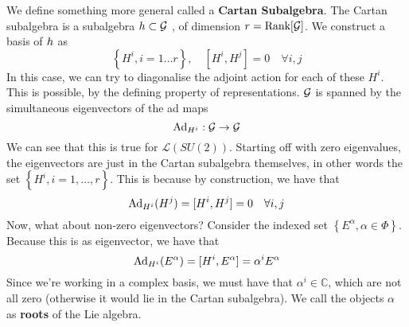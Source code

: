 We define something more general called a \textbf{Cartan Subalgebra}. 
The Cartan subalgebra is a subalgebra $ h \subset \mathcal{ G } $ ,
of dimension $ r = \text{Rank} [ \mathcal{ G } ] $. 
We construct a basis of $ h $ as 
\[
	\left\{  H ^ i , i =1 \dots r  \right\} , \quad [ H ^ i , H ^ j ]  =0 \quad \forall 
	i , j 
\] In this case, we can try to diagonalise the adjoint
action for each of these $ H ^ i $. This is possible, by the defining 
property of representations.
 $ \mathcal{ G } $ is spanned by the simultaneous eigenvectors of the ad maps 
 \[
  \text{Ad}_{ H ^ i } : \mathcal{ G } \to \mathcal{ G } 
 \] We can see that this is 
 true for $ \mathcal{ L } ( SU ( 2) ) $.
 Starting off with zero eigenvalues, the eigenvectors are just in the Cartan 
 subalgebra themselves, in other words the set $\left\{ H ^ i , i = 1 , \dots ,r   \right\} $. 
 This is because by construction, we have that 
 \[
	 \text{Ad} _{ H ^ i } ( H ^ j ) = [ H ^ i , H ^ j ] = 0 \quad \forall i , j 
 \] Now, what about non-zero eigenvectors? 
 Consider the indexed set $ \left\{  E ^ \alpha , \alpha \in \Phi  \right\} $. 
 Because this is as eigenvector, we have that 
 \[
	 \text{Ad}_{ H ^  i } ( E ^{ \alpha } ) = [ H ^ i , E ^{ \alpha } ] = \alpha ^ i E ^ \alpha  
 \] Since we're working in a complex basis, we must have that 
 $ \alpha ^ i \in \mathbb{ C} $, which are not all zero (otherwise it 
 would lie in the Cartan subalgebra). We call the objects $ \alpha $ as 
 \textbf{ roots } of the Lie algebra. 

